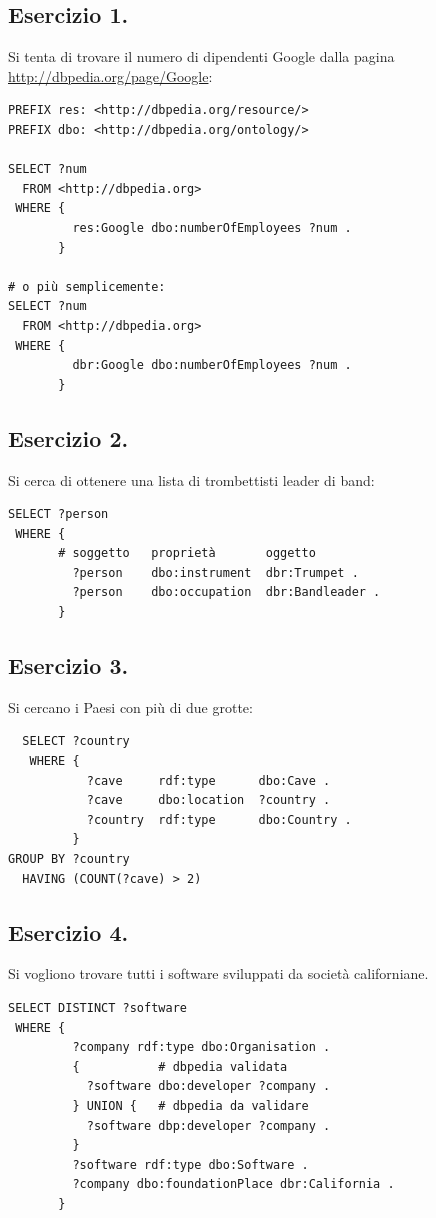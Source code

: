 \documentclass[11pt]{article}
\begin{document}
\subsection*{Esercizio 1.}
Si tenta di trovare il numero di dipendenti Google dalla pagina \url{http://dbpedia.org/page/Google}:
\begin{verbatim}
PREFIX res: <http://dbpedia.org/resource/>
PREFIX dbo: <http://dbpedia.org/ontology/>

SELECT ?num
  FROM <http://dbpedia.org>
 WHERE {
         res:Google dbo:numberOfEmployees ?num .
       }

# o più semplicemente:
SELECT ?num
  FROM <http://dbpedia.org>
 WHERE {
         dbr:Google dbo:numberOfEmployees ?num .
       }
\end{verbatim}

\subsection*{Esercizio 2.}
Si cerca di ottenere una lista di trombettisti leader di band:
\begin{verbatim}
SELECT ?person
 WHERE {
       # soggetto   proprietà       oggetto
         ?person    dbo:instrument  dbr:Trumpet .
         ?person    dbo:occupation  dbr:Bandleader .
       }
\end{verbatim}

\subsection*{Esercizio 3.}
Si cercano i Paesi con più di due grotte:
\begin{verbatim}
  SELECT ?country
   WHERE {
           ?cave     rdf:type      dbo:Cave .
           ?cave     dbo:location  ?country .
           ?country  rdf:type      dbo:Country .
         }
GROUP BY ?country
  HAVING (COUNT(?cave) > 2)
\end{verbatim}

\subsection*{Esercizio 4.}
Si vogliono trovare tutti i software sviluppati da società californiane.
\begin{verbatim}
SELECT DISTINCT ?software
 WHERE {
         ?company rdf:type dbo:Organisation .
         {           # dbpedia validata
           ?software dbo:developer ?company .
         } UNION {   # dbpedia da validare
           ?software dbp:developer ?company .
         }
         ?software rdf:type dbo:Software .
         ?company dbo:foundationPlace dbr:California .
       }
\end{verbatim}
\end{document}
